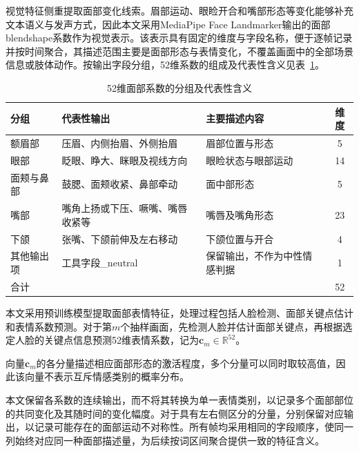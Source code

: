 视觉特征侧重提取面部变化线索。眉部运动、眼睑开合和嘴部形态等变化能够补充文本语义与发声方式，因此本文采用MediaPipe Face Landmarker输出的面部blendshape系数作为视觉表示。该表示具有固定的维度与字段名称，便于逐帧记录并按时间聚合，其描述范围主要是面部形态与表情变化，不覆盖画面中的全部场景信息或肢体动作。按输出字段分组，52维系数的组成及代表性含义见表~\ref{tab:p1_visual_groups}。

\begin{table}[H]
    \centering\small
    \caption{52维面部系数的分组及代表性含义}
    \label{tab:p1_visual_groups}
    \setlength{\tabcolsep}{6pt}
    \renewcommand{\arraystretch}{1.12}
    \ifdefined\pOneCompactTableBox\else\newsavebox{\pOneCompactTableBox}\fi
    \begin{lrbox}{\pOneCompactTableBox}
    \begin{tabular}{l>{\raggedright\arraybackslash}p{16em}>{\raggedright\arraybackslash}p{11em}c}
        \toprule
        分组 & 代表性输出 & 主要描述内容 & 维度\\
        \midrule
        额眉部 & 压眉、内侧抬眉、外侧抬眉 & 眉部位置与形态 & 5\\
        眼部 & 眨眼、睁大、眯眼及视线方向 & 眼睑状态与眼部运动 & 14\\
        面颊与鼻部 & 鼓腮、面颊收紧、鼻部牵动 & 面中部形态 & 5\\
        嘴部 & 嘴角上扬或下压、噘嘴、嘴唇收紧等 & 嘴唇及嘴角形态 & 23\\
        下颌 & 张嘴、下颌前伸及左右移动 & 下颌位置与开合 & 4\\
        其他输出项 & 工具字段\_neutral & 保留输出，不作为中性情感判据 & 1\\
        \midrule
        合计 & & & 52\\
        \bottomrule
    \end{tabular}
    \end{lrbox}
    \usebox{\pOneCompactTableBox}
\end{table}

本文采用预训练模型提取面部表情特征，处理过程包括人脸检测、面部关键点估计和表情系数预测。对于第$m$个抽样画面，先检测人脸并估计面部关键点，再根据选定人脸的关键点信息预测52维表情系数，记为$\boldsymbol{c}_m\in\mathbb{R}^{52}$。

向量$\boldsymbol{c}_m$的各分量描述相应面部形态的激活程度，多个分量可以同时取较高值，因此该向量不表示互斥情感类别的概率分布。

本文保留各系数的连续输出，而不将其转换为单一表情类别，以记录多个面部部位的共同变化及其随时间的变化幅度。对于具有左右侧区分的分量，分别保留对应输出，以记录可能存在的面部运动不对称性。所有帧均采用相同的字段顺序，使同一列始终对应同一种面部描述量，为后续按词区间聚合提供一致的特征含义。

